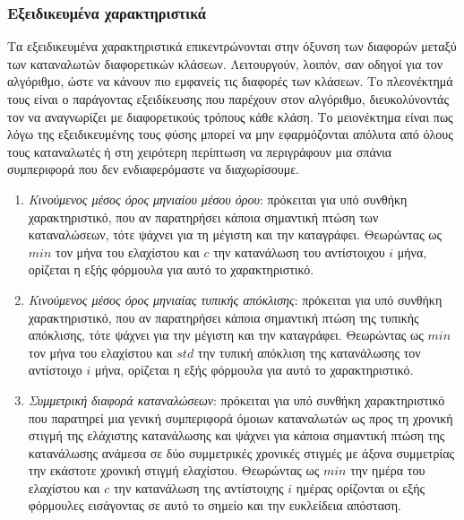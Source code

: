 \subsubsection{Εξειδικευμένα χαρακτηριστικά}
Τα εξειδικευμένα χαρακτηριστικά επικεντρώνονται στην όξυνση των διαφορών μεταξύ των καταναλωτών διαφορετικών κλάσεων. Λειτουργούν, λοιπόν, σαν οδηγοί για τον αλγόριθμο, ώστε να κάνουν πιο εμφανείς τις διαφορές των κλάσεων. Το πλεονέκτημά τους είναι ο παράγοντας εξειδίκευσης που παρέχουν στον αλγόριθμο, διευκολύνοντάς τον να αναγνωρίζει με διαφορετικούς τρόπους κάθε κλάση. Το μειονέκτημα είναι πως λόγω της εξειδικευμένης τους φύσης μπορεί να μην εφαρμόζονται απόλυτα από όλους τους καταναλωτές ή στη χειρότερη περίπτωση να περιγράφουν μια σπάνια συμπεριφορά που δεν ενδιαφερόμαστε να διαχωρίσουμε.
\begin{enumerate}
\item{\textit{Κινούμενος μέσος όρος μηνιαίου μέσου όρου}}: πρόκειται για υπό συνθήκη χαρακτηριστικό, που αν παρατηρήσει κάποια σημαντική πτώση των καταναλώσεων, τότε ψάχνει για τη μέγιστη και την καταγράφει. Θεωρώντας ως $min$ τον μήνα του ελαχίστου και $c$ την κατανάλωση του αντίστοιχου $i$ μήνα, ορίζεται η εξής φόρμουλα για αυτό το χαρακτηριστικό. 
\begin{center}
\end{center}
\item{\textit{Κινούμενος μέσος όρος μηνιαίας τυπικής απόκλισης}}: πρόκειται για υπό συνθήκη χαρακτηριστικό, που αν παρατηρήσει κάποια σημαντική πτώση της τυπικής απόκλισης, τότε ψάχνει για την μέγιστη και την καταγράφει. Θεωρώντας ως $min$ τον μήνα του ελαχίστου και $std$ την τυπική απόκλιση της κατανάλωσης τον αντίστοιχο $i$ μήνα, ορίζεται η εξής φόρμουλα για αυτό το χαρακτηριστικό. 
\begin{center}
\end{center}
\item{\textit{Συμμετρική διαφορά καταναλώσεων}}: πρόκειται για υπό συνθήκη χαρακτηριστικό που παρατηρεί μια γενική συμπεριφορά όμοιων καταναλωτών ως προς τη χρονική στιγμή της ελάχιστης κατανάλωσης και ψάχνει για κάποια σημαντική πτώση της κατανάλωσης ανάμεσα σε δύο συμμετρικές χρονικές στιγμές με άξονα συμμετρίας την εκάστοτε χρονική στιγμή ελαχίστου. Θεωρώντας ως $min$ την ημέρα του ελαχίστου και $c$ την κατανάλωση της αντίστοιχης $i$ ημέρας ορίζονται οι εξής φόρμουλες εισάγοντας σε αυτό το σημείο και την ευκλείδεια απόσταση.

\end{enumerate}
